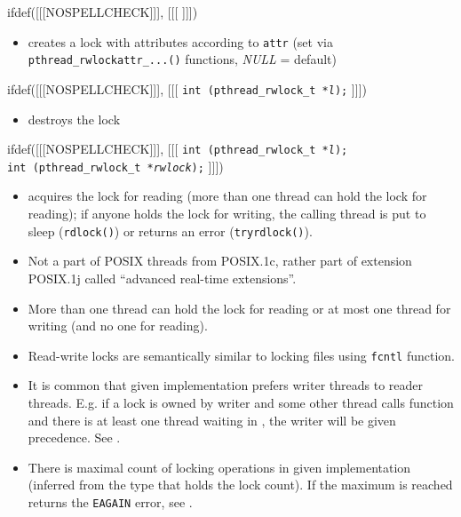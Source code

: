 \begin{slide}
\prgchars
ifdef([[[NOSPELLCHECK]]], [[[
]]])
\begin{itemize}
\item creates a lock with attributes according to \texttt{attr}
(set via \texttt{pthread\_rwlockattr\_...()} functions, \emph{NULL} = default)
\end{itemize}
ifdef([[[NOSPELLCHECK]]], [[[
\texttt{int (pthread\_rwlock\_t *\emph{l});}
]]])
\begin{itemize}
\item destroys the lock
\end{itemize}
ifdef([[[NOSPELLCHECK]]], [[[
\texttt{int (pthread\_rwlock\_t *\emph{l});}\\
\texttt{int (pthread\_rwlock\_t *\emph{rwlock});}
]]])
\begin{itemize}
\item acquires the lock for reading (more than one thread can hold the lock
for reading); if anyone holds the lock for writing, the calling thread is put
to sleep (\texttt{rdlock()}) or returns an error (\texttt{tryrdlock()}).
\end{itemize}
\end{slide}

\label{RWLOCKS}

\begin{itemize}
\item Not a part of POSIX threads from POSIX.1c, rather part of extension
POSIX.1j called ``advanced real-time extensions''.
\item More than one thread can hold the lock for reading or at most one
thread for writing (and no one for reading).
\item Read-write locks are semantically similar to locking files using
\texttt{fcntl} function.
\item It is common that given implementation prefers writer threads to
reader threads. E.g. if a lock is owned by writer and some other thread
calls function  and there is at least one thread
waiting in , the writer will be given precedence.
See .
\item There is maximal count of locking operations in given implementation
(inferred from the type that holds the lock count). If the maximum is reached
 returns the \texttt{EAGAIN} error,
see .
\end{itemize}

